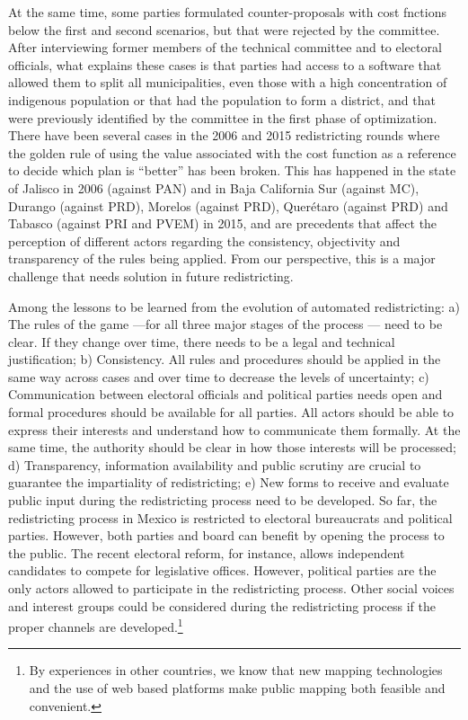 \documentclass[letter,12pt]{article}
\begin{document}
At the same time, some parties formulated counter-proposals with cost fnctions below the first and second scenarios, but that were rejected by the committee. After interviewing former members of the technical committee and to electoral officials, what explains these cases is that parties had access to a software that allowed them to split all municipalities, even those with a high concentration of indigenous population or that had the population to form a district, and that were previously identified by the committee in the first phase of optimization. There have been several cases in the 2006 and 2015 redistricting rounds where the golden rule of using the value associated with the cost function as a reference to decide which plan is ``better'' has been broken. This has happened in the state of Jalisco in 2006 (against PAN) and in Baja California Sur (against MC), Durango (against PRD), Morelos (against PRD), Quer\'etaro (against PRD) and Tabasco (against PRI and PVEM) in 2015, and are precedents that affect the perception of different actors regarding the consistency, objectivity and transparency of the rules being applied. From our perspective, this is a major challenge that needs solution in future redistricting. 

Among the lessons to be learned from the evolution of automated redistricting: a) The rules of the game ---for all three major stages of the process ---  need to be clear. If they change over time, there needs to be a legal and technical justification; b) Consistency. All rules and procedures should be applied in the same way across cases and over time to decrease the levels of uncertainty; c) Communication between electoral officials and political parties needs open and formal procedures should be available for all parties. All actors should be able to express their interests and understand how to communicate them formally. At the same time, the authority should be clear in how those interests will be processed; d) Transparency, information availability and public scrutiny are crucial to guarantee the impartiality of redistricting; e) New forms to receive and evaluate public input during the redistricting process need to be developed.  So far, the redistricting process in Mexico is restricted to electoral bureaucrats and political parties. However, both parties and board can benefit by opening the process to the public. The recent electoral reform, for instance, allows independent candidates to compete for legislative offices. However, political parties are the only actors allowed to participate in the redistricting process. Other social voices and interest groups could be considered during the redistricting process if the proper channels are developed.\footnote{By experiences in other countries, we know that new mapping technologies and the use of web based platforms make public mapping both feasible and convenient.}   
\end{document}
